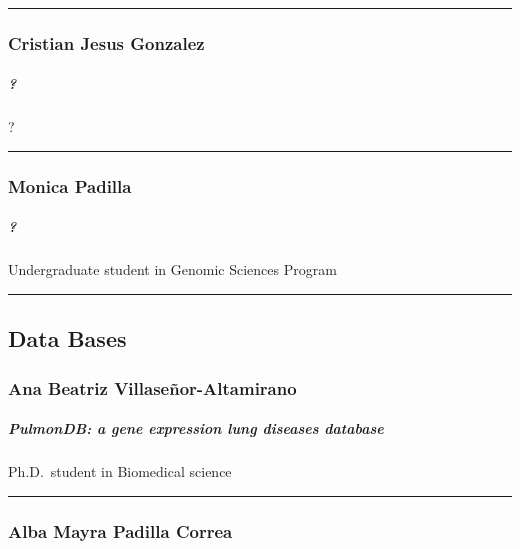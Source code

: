 \documentclass[]{article}
\let\oldsubparagraph\subparagraph
\renewcommand{\subparagraph}[1]{\oldsubparagraph{#1}\mbox{}}
\begin{document}
\begin{center}\rule{0.5\linewidth}{\linethickness}\end{center}

\subsubsection{Cristian Jesus Gonzalez}\label{cristian-jesus-gonzalez}

\subparagraph{ ?}\label{section-1}

?

\begin{center}\rule{0.5\linewidth}{\linethickness}\end{center}

\subsubsection{Monica Padilla}\label{monica-padilla}

\subparagraph{ ?}\label{section-2}

Undergraduate student in Genomic Sciences Program

\begin{center}\rule{0.5\linewidth}{\linethickness}\end{center}

\subsection{Data Bases}\label{data-bases}

\subsubsection{Ana Beatriz
Villaseñor-Altamirano}\label{ana-beatriz-villasenor-altamirano}

\subparagraph{ PulmonDB: a gene expression lung diseases
database}\label{pulmondb-a-gene-expression-lung-diseases-database}

Ph.D.~student in Biomedical science

\begin{center}\rule{0.5\linewidth}{\linethickness}\end{center}

\subsubsection{Alba Mayra Padilla
Correa}\label{alba-mayra-padilla-correa}
\end{document}
